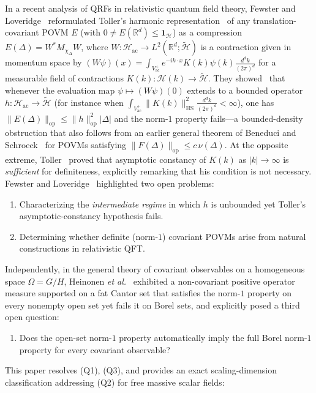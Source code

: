\documentclass[11pt,a4paper]{article}
\theoremstyle{definition}
\theoremstyle{remark}
\newcommand{\HH}{\mathcal{H}}
\newcommand{\tH}{\widetilde{\mathcal{H}}}
\newcommand{\RR}{\mathbb{R}}
\newcommand{\op}{\mathrm{op}}
\newcommand{\HS}{\mathrm{HS}}
\newcommand{\ac}{\mathrm{ac}}
\newcommand{\one}{\mathbf{1}}
\newcommand{\norm}[1]{\|#1\|}
\begin{document}
In a recent analysis of QRFs in relativistic quantum field theory, Fewster and Loveridge~\cite{FewsterLoveridge2026} reformulated Toller's harmonic representation~\cite{Toller1999} of any translation-covariant POVM $E$ (with $0\neq E(\RR^d)\le\one_\HH$) as a compression $E(\Delta)=W^* M_{\chi_\Delta} W$, where $W:\HH_\ac\to L^2(\RR^d;\tH)$ is a contraction given in momentum space by $(W\psi)(x)=\int_{V_\ac^+} e^{-ik\cdot x} K(k)\psi(k)\frac{d^dk}{(2\pi)^d}$ for a measurable field of contractions $K(k):\HH(k)\to\tH$. They showed~\cite[Thm.~2.7 and Cor.~2.8]{FewsterLoveridge2026} that whenever the evaluation map $\psi\mapsto (W\psi)(0)$ extends to a bounded operator $h:\HH_\ac\to\tH$ (for instance when $\int_{V_\ac^+}\norm{K(k)}_{\HS}^2\frac{d^dk}{(2\pi)^d}<\infty$), one has $\norm{E(\Delta)}_{\op}\le \norm{h}_{\op}^2|\Delta|$ and the norm-$1$ property fails---a bounded-density obstruction that also follows from an earlier general theorem of Beneduci and Schroeck~\cite[Thm.~2.10]{BeneduciSchroeck2012} for POVMs satisfying $\norm{F(\Delta)}_{\op}\le c\,\nu(\Delta)$. At the opposite extreme, Toller~\cite[Prop.~5]{Toller1999} proved that asymptotic constancy of $K(k)$ as $|k|\to\infty$ is \emph{sufficient} for definiteness, explicitly remarking that his condition is not necessary. Fewster and Loveridge~\cite[Rem.~2.10 and Sec.~5]{FewsterLoveridge2026} highlighted two open problems:
\begin{enumerate}[leftmargin=*,nosep]
\item[(Q1)] Characterizing the \emph{intermediate regime} in which $h$ is unbounded yet Toller's asymptotic-constancy hypothesis fails.
\item[(Q2)] Determining whether definite (norm-$1$) covariant POVMs arise from natural constructions in relativistic QFT.
\end{enumerate}
Independently, in the general theory of covariant observables on a homogeneous space $\Omega = G/H$, Heinonen \emph{et al.}~\cite[Sec.~5.1]{Heinonen2003} exhibited a non-covariant positive operator measure supported on a fat Cantor set that satisfies the norm-$1$ property on every nonempty open set yet fails it on Borel sets, and explicitly posed a third open question:
\begin{enumerate}[leftmargin=*,nosep]
\item[(Q3)] Does the open-set norm-$1$ property automatically imply the full Borel norm-$1$ property for every covariant observable?
\end{enumerate}

This paper resolves (Q1), (Q3), and provides an exact scaling-dimension classification addressing (Q2) for free massive scalar fields:
\end{document}
